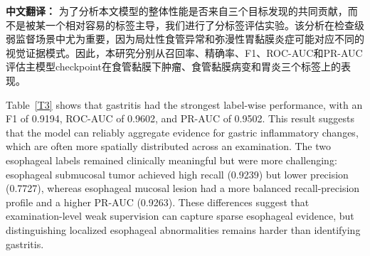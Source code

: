 \documentclass[Afour,sagev,times]{sagej}
\begin{document}
\textbf{中文翻译：} 为了分析本文模型的整体性能是否来自三个目标发现的共同贡献，而不是被某一个相对容易的标签主导，我们进行了分标签评估实验。该分析在检查级弱监督场景中尤为重要，因为局灶性食管异常和弥漫性胃黏膜炎症可能对应不同的视觉证据模式。因此，本研究分别从召回率、精确率、F1、ROC-AUC和PR-AUC评估主模型checkpoint在食管黏膜下肿瘤、食管黏膜病变和胃炎三个标签上的表现。

\begin{table}[t]
\footnotesize\sf\centering
\caption{Label-wise internal test performance of the proposed model.\label{T3}}
\end{table}

Table~\ref{T3} shows that gastritis had the strongest label-wise performance, with an F1 of 0.9194, ROC-AUC of 0.9602, and PR-AUC of 0.9502. This result suggests that the model can reliably aggregate evidence for gastric inflammatory changes, which are often more spatially distributed across an examination. The two esophageal labels remained clinically meaningful but were more challenging: esophageal submucosal tumor achieved high recall (0.9239) but lower precision (0.7727), whereas esophageal mucosal lesion had a more balanced recall-precision profile and a higher PR-AUC (0.9263). These differences suggest that examination-level weak supervision can capture sparse esophageal evidence, but distinguishing localized esophageal abnormalities remains harder than identifying gastritis.
\end{document}
